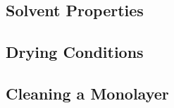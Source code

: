 \documentclass[\main/dresen_thesis.tex]{subfiles}
\renewcommand{\thisPath}{\main/chapters/monolayers/preparationMonolayers}
\begin{document}

    \subsection{Solvent Properties}
    
    \FloatBarrier

  \subsection{Drying Conditions}
    

    \subsection{Cleaning a Monolayer}
    
  \FloatBarrier
\end{document}
